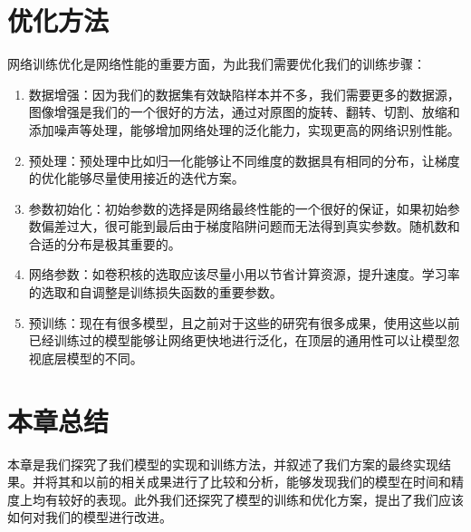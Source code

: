 \section{优化方法}
网络训练优化是网络性能的重要方面，为此我们需要优化我们的训练步骤：

\begin{enumerate}
    \item 数据增强：因为我们的数据集有效缺陷样本并不多，我们需要更多的数据源，图像增强是我们的一个很好的方法，通过对原图的旋转、翻转、切割、放缩和添加噪声等处理，能够增加网络处理的泛化能力，实现更高的网络识别性能。
    \item 预处理：预处理中比如归一化能够让不同维度的数据具有相同的分布，让梯度的优化能够尽量使用接近的迭代方案。
    \item 参数初始化：初始参数的选择是网络最终性能的一个很好的保证，如果初始参数偏差过大，很可能到最后由于梯度陷阱问题而无法得到真实参数。随机数和合适的分布是极其重要的。
    \item 网络参数：如卷积核的选取应该尽量小用以节省计算资源，提升速度。学习率的选取和自调整是训练损失函数的重要参数。
    \item 预训练：现在有很多模型，且之前对于这些的研究有很多成果，使用这些以前已经训练过的模型能够让网络更快地进行泛化，在顶层的通用性可以让模型忽视底层模型的不同。
\end{enumerate}

\section{本章总结}

本章是我们探究了我们模型的实现和训练方法，并叙述了我们方案的最终实现结果。并将其和以前的相关成果进行了比较和分析，能够发现我们的模型在时间和精度上均有较好的表现。此外我们还探究了模型的训练和优化方案，提出了我们应该如何对我们的模型进行改进。